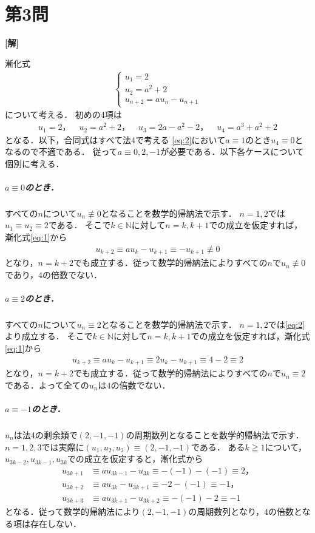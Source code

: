 \documentclass[../main.tex]{subfiles}
\begin{document}
\newpage
\section*{第3問}

{\bf [解]}

漸化式
\begin{align}
  \begin{cases}
    u_1 = 2 \\
    u_2 = a^2+2 \\
    u_{n+2} = au_{n}-u_{n+1}
  \end{cases} \label{eq:1}
\end{align}
について考える．
初めの4項は
\begin{align}
  u_1=2，\quad u_2=a^2+2，\quad u_3=2a-a^2-2，\quad
  u_4=a^3+a^2+2 \label{eq:2}
\end{align}
となる．以下，合同式はすべて法4で考える
\cref{eq:2}において$a\equiv1$のとき$u_4\equiv0$となるので不適である．
従って$a\equiv0,2,-1$が必要である．以下各ケースについて個別に考える．

\subparagraph{$a\equiv0$のとき．}

すべての$n$について$u_n\not\equiv0$となることを数学的帰納法で示す．
$n=1,2$では$u_1\equiv u_2\equiv2$である．
そこで$k\in\mathbb{N}$に対して$n=k,k+1$での成立を仮定すれば，漸化式\cref{eq:1}から
\begin{align}
  u_{k+2}\equiv au_k - u_{k+1} \equiv -u_{k+1}\not\equiv0
\end{align}
となり，$n=k+2$でも成立する．従って数学的帰納法によりすべての$n$で$u_n\not\equiv0$であり，$4$の倍数でない．

\subparagraph{$a\equiv2$のとき．}
すべての$n$について$u_n\equiv2$となることを数学的帰納法で示す．
$n=1,2$では\cref{eq:2}より成立する．
そこで$k\in\mathbb{N}$に対して$n=k,k+1$での成立を仮定すれば，漸化式\cref{eq:1}から
\begin{align}
  u_{k+2} \equiv au_k - u_{k+1} \equiv 2u_k-u_{k+1}\equiv 4-2 \equiv 2
\end{align}
となり，$n=k+2$でも成立する．従って数学的帰納法によりすべての$n$で$u_n\equiv2$である．よって全ての$u_n$は$4$の倍数でない．

\subparagraph{$a\equiv-1$のとき．}
$u_n$は法4の剰余類で$(2,-1,-1)$の周期数列となることを数学的帰納法で示す．
$n=1,2,3$では実際に$(u_1,u_2,u_3)\equiv(2,-1,-1)$である．
ある$k\geqq1$について，$u_{3k-2},u_{3k-1},u_{3k}$での成立を仮定すると，漸化式から
\begin{align}
  u_{3k+1}&\equiv au_{3k-1} - u_{3k}   \equiv-(-1)-(-1)\equiv2，\\
  u_{3k+2}&\equiv au_{3k}   - u_{3k+1} \equiv -2-(-1)\equiv-1，\\
  u_{3k+3}&\equiv au_{3k+1} - u_{3k+2} \equiv -(-1)-2\equiv-1
\end{align}
となる．従って数学的帰納法により$(2,-1,-1)$の周期数列となり，$4$の倍数となる項は存在しない．
\casesend
\end{document}
